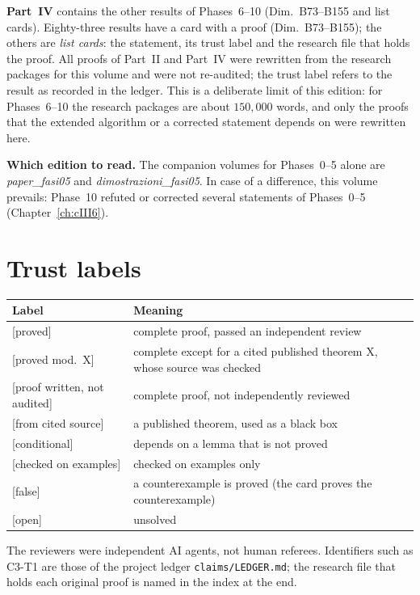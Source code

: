 \documentclass[11pt,a4paper,oneside]{report}
\newcommand{\badge}[2]{\textcolor{#1}{\textsf{\footnotesize[#2]}}}
\newcommand{\proved}{\badge{cC}{proved}}
\newcommand{\pw}{\badge{cD}{proof written, not audited}}
\newcommand{\cf}{\badge{cD}{from cited source}}
\newcommand{\modulo}[1]{\badge{cD}{proved mod.\ #1}}
\newcommand{\condl}{\badge{cD}{conditional}}
\newcommand{\vex}{\badge{cD}{checked on examples}}
\newcommand{\openq}{\badge{cB}{open}}
\newcommand{\falsest}{\badge{cB}{false}}
\begin{document}
\textbf{Part~IV} contains the other results of Phases~6--10 (Dim.~B73--B155 and list cards). Eighty-three results have a card with a proof (Dim.~B73--B155); the others are \emph{list cards}: the statement, its trust label and the research file that holds the proof. All proofs of Part~II and Part~IV were rewritten from the research packages for this volume and were not re-audited; the trust label refers to the result as recorded in the ledger. This is a deliberate limit of this edition: for Phases~6--10 the research packages are about $150{,}000$ words, and only the proofs that the extended algorithm or a corrected statement depends on were rewritten here.

\textbf{Which edition to read.} The companion volumes for Phases~0--5 alone are \emph{paper\_fasi05} and \emph{dimostrazioni\_fasi05}. In case of a difference, this volume prevails: Phase~10 refuted or corrected several statements of Phases~0--5 (Chapter~\ref{ch:cIII6}).

\section*{Trust labels}

\begin{center}\small
\begin{tabular}{@{}L{4.4cm}L{10.0cm}@{}}
\toprule
Label & Meaning\\\midrule
\proved & complete proof, passed an independent review\\
\modulo{X} & complete except for a cited published theorem X, whose source was checked\\
\pw & complete proof, not independently reviewed\\
\cf & a published theorem, used as a black box\\
\condl & depends on a lemma that is not proved\\
\vex & checked on examples only\\
\falsest & a counterexample is proved (the card proves the counterexample)\\
\openq & unsolved\\\bottomrule
\end{tabular}
\end{center}

The reviewers were independent AI agents, not human referees. Identifiers such as C3-T1 are those of the project ledger \texttt{claims/LEDGER.md}; the research file that holds each original proof is named in the index at the end.
\end{document}
